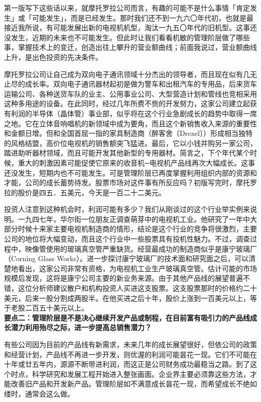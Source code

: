 \documentclass[UTF8,a4paper,zihao=-4,fontset = windows]{ctexart} %
\begin{document}
第一版写下这些话以来，就摩托罗拉公司而言，有趣的可能不是什么事情「肯定发生」或「可能发生」，而是已经发生。那时我们还不到一九六〇年代初，也就是最接近我所说，有可能发展出新的电视机机型，淘汰一九五〇年代的旧机型。这事还没发生，近期的未来也不可能发生。但此时让我们看看机敏的管理阶层做了哪些事，掌握技术上的变迁，创造出往上攀升的营业额曲线；前面我说过，营业额曲线上升，是出色投资的先决条件。

摩托罗拉公司让自己成为双向电子通讯领域十分杰出的领导者，而且现在似有几无止尽的成长率。双向电子通讯器材起初是做为警车和出租汽车的专用品，后来货车运输公司、各种送货车队的业主、公用事业公司、大型营造计划和管线也竞相采用这种多用途的设备。在此同时，经过几年所费不赀的开发努力，这家公司建立起获有利润的半导体（晶体管）事业部，似乎将在这个行业急剧成长的趋势中取得一席之地。它在立体音响唱机的新领域中成为要角，而且这个新销售收入来源的重要性和金额日增。但和全国首屈一指的家具制造商（醉客舍〔Drexel〕）形成相当独特的风格结盟，高价位电视机的销售额突飞猛进。最后，它以小钱并购另一家公司，踏进助听器材领域，而且可能开发其他新型的专用器材。简言之，下个年代某个时候，重大的刺激因素可能促使它原来的收音机─电视机产品线再次大幅成长。这事还没发生，短期内也不可能发生。可是管理阶层已再度掌握利用组织内部的资源和才能，公司的成长蓄势待发。股票市场对这件事有所反应吗？初版写完时，摩托罗拉的股价是四五．五美元，今天是一百二十二美元。

投资人注意到这种机会时，利润可能有多少？我们从刚谈过的这个行业举实例来说明。一九四七年，华尔街一位朋友正调查萌芽中的电视机工业。他研究了一年中大部分时候十来家主要电视机制造商的情形，结论是这个行业的竞争将很激烈，主要公司的地位将大幅变动，而且这个行业中一些股票具有投机性魅力。不过，调查过程中，映像管使用的玻璃真空管严重缺货。经营最成功的制造商似乎是康宁玻璃厂（Corning Glass Works）。进一步探讨康宁玻璃厂的技术面和研究面之后，可以清楚地看出，这家公司非常有资格，为电视机工业生产玻璃真空管。估计可能的市场规模后发现，这将是康宁公司主要的新业务来源。由于其他产品线的展望普遍不错，这位分析师建议散户和机构投资人买进这支股票。这支股票那时的价格约二十美元，后来一股分割成两股半。在他买进之后十年，股价上涨到一百美元以上，等于老股二百五十美元以上。
\\

\textbf{要点二：管理阶层是不是决心继续开发产品或制程，在目前富有吸引力的产品线成长潜力利用殆尽之际，进一步提高总销售潜力？}


有些公司因为目前的产品线有新需求，未来几年的成长展望很好，但依公司的政策和经营计划，产品线不再进一步开发，则优渥的利润可能昙花一现。它们不可能在十年或廿五年内，源源不断带进利润，而这正是公司财务成功最稳当之路。到了这个时点，科学研究和发展工程开始进入整张画面。企业界主要必须靠这些方法，才能改善旧产品和开发新产品。管理阶层如不满意成长昙花一现，而希望成长不绝如缕时，通常会这么做。
\end{document}
